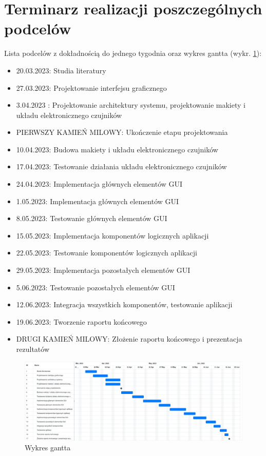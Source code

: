 \section{Terminarz realizacji poszczególnych podcelów}
    Lista podcelów z dokładnością do jednego tygodnia oraz wykres gantta (wykr. \ref{fig: gantt}):
\begin{itemize}
    \item 
        20.03.2023: Studia literatury 
    \item 
        27.03.2023: Projektowanie interfejsu graficznego
    \item 
        3.04.2023 : Projektowanie architektury systemu, projektowanie makiety i układu elektronicznego czujników
        \item PIERWSZY KAMIEŃ MILOWY: Ukończenie etapu projektowania
    \item 
        10.04.2023: Budowa makiety i układu elektronicznego czujników
    \item 
        17.04.2023: Testowanie działania układu elektronicznego czujników
    \item 
        24.04.2023: Implementacja głównych elementów GUI
    \item 
        1.05.2023: Implementacja głównych elementów GUI
    \item 
        8.05.2023: Testowanie głównych elementów GUI
    \item 
        15.05.2023: Implementacja komponentów logicznych aplikacji
    \item 
        22.05.2023: Testowanie komponentów logicznych aplikacji
    \item 
        29.05.2023: Implementacja pozostałych elementów GUI
    \item 
        5.06.2023: Testowanie pozostałych elementów GUI
    \item 
        12.06.2023: Integracja wszystkich komponentów, testowanie aplikacji
    \item 
        19.06.2023: Tworzenie raportu końcowego
    \item DRUGI KAMIEŃ MILOWY:  Złożenie raportu końcowego i prezentacja rezultatów
\end{itemize}

\begin{figure}
    \centering
    \includegraphics[width = \textheight, angle = 270]{obrazy/wsd_gantt.png}
    \caption{Wykres gantta}
    \label{fig: gantt}
\end{figure}

